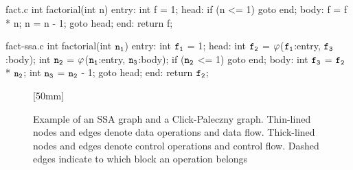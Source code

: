 \begin{filecontents*}{fact.c}
int factorial(int n) {
  entry:
    int f = 1;
  head:
    if (n <= 1) goto end;
  body:
    f = f * n;
    n = n - 1;
    goto head;
  end:
    return f;
}
\end{filecontents*}

\begin{filecontents*}{fact-ssa.c}
int factorial(int $\irVar{n}[1]$) {
  entry:
    int $\irVar{f}[1]$ = 1;
  head:
    int $\irVar{f}[2]$ = $\mPhi$($\irVar{f}[1]$:entry, $\irVar{f}[3]$:body);
    int $\irVar{n}[2]$ = $\mPhi$($\irVar{n}[1]$:entry, $\irVar{n}[3]$:body);
    if ($\irVar{n}[2]$ <= 1) goto end;
  body:
    int $\irVar{f}[3]$ = $\irVar{f}[2]$ * $\irVar{n}[2]$;
    int $\irVar{n}[3]$ = $\irVar{n}[2]$ - 1;
    goto head;
  end:
    return $\irVar{f}[2]$;
}
\end{filecontents*}

\begin{figure}
  \centering%
  \mbox{}%
  \hfill%
                [50mm]%
                {}%
  \hfill%
                {}%
  \hfill%
  \mbox{}

  \vspace*{\betweensubfigures}

                {%
                }

  \vspace*{\betweensubfigures}


  \caption[%
            Example of an SSA graph and a Click-Paleczny graph%
          ]%
          {%
            Example of an SSA graph and a Click-Paleczny graph.
            Thin-lined nodes and edges denote data operations and data flow.
            Thick-lined nodes and edges denote control operations and control
            flow.
            Dashed edges indicate to which block an operation belongs%
          }
\end{figure}

